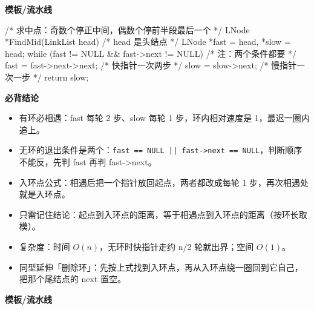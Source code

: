\documentclass[10pt,a4paper]{ctexart}
\begin{document}
\textbf{模板/流水线}

\begin{codebox}
/* 求中点：奇数个停正中间，偶数个停前半段最后一个 */
LNode *FindMid(LinkList head) {            /* head 是头结点 */
    LNode *fast = head, *slow = head;
    while (fast != NULL && fast->next != NULL) {   /* 注：两个条件都要 */
        fast = fast->next->next;                   /* 快指针一次两步 */
        slow = slow->next;                         /* 慢指针一次一步 */
    }
    return slow;
}
\end{codebox}





\textbf{必背结论}

\begin{itemize}

\item 有环必相遇：fast 每轮 2 步、slow 每轮 1 步，环内相对速度是 1，最迟一圈内追上。

\item 无环的退出条件是两个：\texttt{fast == NULL || fast->next == NULL}，判断顺序不能反，先判 fast 再判 fast->next。

\item 入环点公式：相遇后把一个指针放回起点，两者都改成每轮 1 步，再次相遇处就是入环点。

\item 只需记住结论：起点到入环点的距离，等于相遇点到入环点的距离（按环长取模）。

\item 复杂度：时间 $O(n)$，无环时快指针走约 n/2 轮就出界；空间 $O(1)$。

\item 同型延伸「删除环」：先按上式找到入环点，再从入环点绕一圈回到它自己，把那个尾结点的 next 置空。

\end{itemize}

\textbf{模板/流水线}
\end{document}
